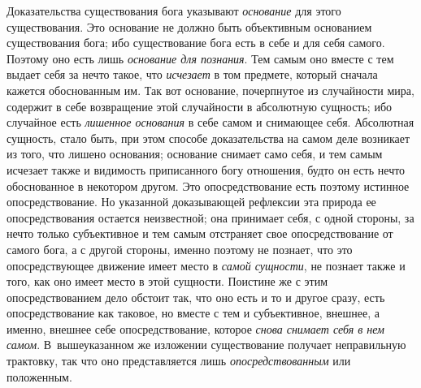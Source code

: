 Доказательства существования бога указывают
{\em основание} для этого существования. Это основание
не должно быть объективным основанием существования бога; ибо существование
бога есть в себе и для себя самого. Поэтому оно есть лишь
{\em основание для познания}. Тем самым оно вместе с
тем выдает себя за нечто такое, что {\em исчезает} в
том предмете, который сначала кажется обоснованным им. Так вот основание,
почерпнутое из случайности мира, содержит в себе возвращение этой
случайности в абсолютную сущность; ибо случайное есть
{\em лишенное основания} в себе самом и снимающее себя.
Абсолютная сущность, стало быть, при этом способе доказательства на самом
деле возникает из того, что лишено основания; основание снимает само себя,
и тем самым исчезает также и видимость приписанного богу отношения, будто
он есть нечто обоснованное в некотором другом. Это опосредствование есть
поэтому истинное опосредствование. Но указанной доказывающей рефлексии эта
природа ее опосредствования остается неизвестной; она принимает себя, с
одной стороны, за нечто только субъективное и тем самым отстраняет свое
опосредствование от самого бога, а с другой стороны, именно поэтому не
познает, что это опосредствующее движение имеет место в
{\em самой сущности}, не познает также и того, как оно
имеет место в этой сущности. Поистине же с этим опосредствованием дело
обстоит так, что оно есть и то и другое сразу, есть опосредствование как
таковое, но вместе с тем и субъективное, внешнее, а именно, внешнее себе
опосредствование, которое {\em снова снимает себя в нем
самом}. В~вышеуказанном же изложении существование получает неправильную
трактовку, так что оно представляется лишь
{\em опосредствованным} или положенным.


